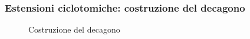 \documentclass[11pt]{beamer}
\begin{document}
\begin{frame}
\frametitle{Estensioni ciclotomiche: costruzione del decagono}

\begin{figure}[!h]
\begin{center}
\caption{Costruzione del decagono}
\end{center}
\end{figure}

\end{frame}
\end{document}
